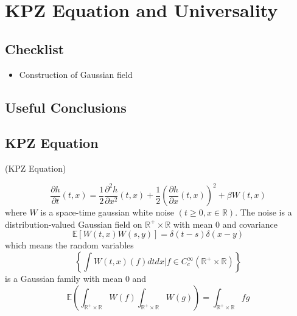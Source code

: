 \section{KPZ Equation and Universality}

\subsection{Checklist}

\begin{itemize}
    \item Construction of Gaussian field
\end{itemize}
\subsection{Useful Conclusions}

\subsection{KPZ Equation}

\begin{definition}
    (KPZ Equation)\par
    \[
    \dfrac{\partial h}{\partial t}(t,x) = \dfrac{1}{2}\dfrac{\partial^2 h}{\partial x^2}(t,x) + \dfrac{1}{2}\left(\dfrac{\partial h}{\partial x}(t,x)\right)^2 + \beta W(t,x)
    \]
    where $W$ is a space-time gaussian white noise $(t\geq 0, x\in\mathbb{R})$. The noise is a distribution-valued Gaussian field on $\mathbb{R}^+\times\mathbb{R}$ with mean $0$ and covariance
    \[
    \mathbb{E}[W(t,x)W(s,y)] = \delta(t-s)\delta(x-y)
    \]
    which means the random variables
    \[
    \left\{\int W(t,x)(f)dtdx|f \in C^{\infty}_c(\mathbb{R}^+\times\mathbb{R})\right\}
    \]
    is a Gaussian family with mean $0$ and
    \[
    \mathbb{E} \left(\int_{\mathbb{R}^+\times\mathbb{R}} W(f)\int_{\mathbb{R}^+\times\mathbb{R}} W(g)\right) = \int_{\mathbb{R}^+\times\mathbb{R}} fg
    \]
\end{definition}
